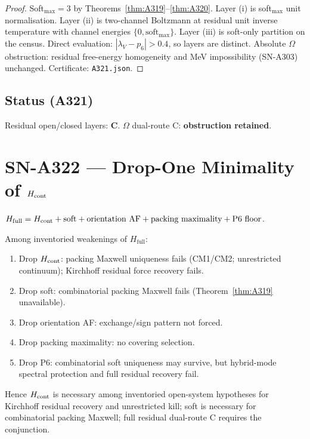 \begin{proof}
Soft$_{\max}=3$ by Theorems~\ref{thm:A319}--\ref{thm:A320}. Layer (i) is soft$_{\max}$ unit normalisation. Layer (ii) is two-channel Boltzmann at residual unit inverse temperature with channel energies $\{0,\mathrm{soft}_{\max}\}$. Layer (iii) is soft-only partition on the census. Direct evaluation: $|\lambda_V-p_6|>0.4$, so layers are distinct. Absolute $\Omega$ obstruction: residual free-energy homogeneity and MeV impossibility (SN-A303) unchanged. Certificate: \texttt{A321.json}.
\end{proof}

\subsection*{Status (A321)}
Residual open/closed layers: \textbf{C}. $\Omega$ dual-route C: \textbf{obstruction retained}.

\section{SN-A322 --- Drop-One Minimality of $H_{\rm cont}$}
\label{sec:SN-A322}

\begin{definition}
\label{def:A322-pkg}
$H_{\mathrm{full}}=H_{\rm cont}+\mathrm{soft}+\text{orientation AF}+\text{packing maximality}+\text{P6 floor}$.
\end{definition}

\begin{theorem}
\label{thm:A322}
Among inventoried weakenings of $H_{\mathrm{full}}$:
\begin{enumerate}[label=(\roman*)]
\item Drop $H_{\rm cont}$: packing Maxwell uniqueness fails (CM1/CM2; unrestricted continuum); Kirchhoff residual force recovery fails.
\item Drop soft: combinatorial packing Maxwell fails (Theorem~\ref{thm:A319} unavailable).
\item Drop orientation AF: exchange/sign pattern not forced.
\item Drop packing maximality: no covering selection.
\item Drop P6: combinatorial soft uniqueness may survive, but hybrid-mode spectral protection and full residual recovery fail.
\end{enumerate}
Hence $H_{\rm cont}$ is necessary among inventoried open-system hypotheses for Kirchhoff residual recovery and unrestricted kill; soft is necessary for combinatorial packing Maxwell; full residual dual-route C requires the conjunction.
\end{theorem}


